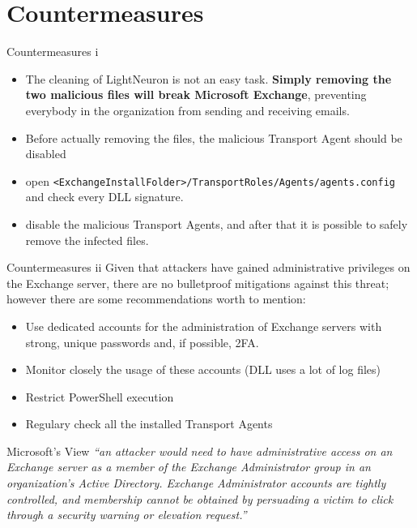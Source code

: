 \section{Countermeasures}

\begin{frame}[fragile]{Countermeasures i}
    \begin{itemize}
        \item The cleaning of LightNeuron is not an easy task. \textbf{Simply removing the two malicious files will break
Microsoft Exchange}, preventing everybody in the organization from sending and receiving emails.
        \item Before actually removing the files, the malicious Transport Agent should be disabled
        \item open \texttt{<ExchangeInstallFolder>/TransportRoles/Agents/agents.config} and check every DLL signature.
        \item disable the malicious Transport Agents, and after that it is possible to safely remove the infected files.
    \end{itemize}
\end{frame}

\begin{frame}[fragile]{Countermeasures ii}
Given that attackers have gained administrative privileges on the Exchange server, there are no bulletproof
        mitigations against this threat; however there are some recommendations worth to mention:
    \begin{itemize}
        \item Use dedicated accounts for the administration of Exchange servers with strong, unique passwords
        and, if possible, 2FA.
        \item Monitor closely the usage of these accounts (DLL uses a lot of log files)
        \item Restrict PowerShell execution
        \item Regulary check all the installed Transport Agents
    \end{itemize}
\end{frame}

\begin{frame}[fragile]{Microsoft’s View}
    \emph{``an attacker would need to have administrative access on an Exchange server as a member of the Exchange
     Administrator group in an organization’s Active Directory.  Exchange Administrator accounts are tightly controlled,
      and membership cannot be obtained by persuading a victim to click through a security warning or elevation request.''} \cite{Petri}
\end{frame}

